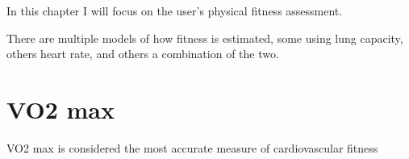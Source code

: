 In this chapter I will focus on the user's physical fitness assessment.

There are multiple models of how fitness is estimated, some using lung capacity, others heart rate, and others a combination of the two.

\section{VO2 max}
VO2 max is considered the most accurate measure of cardiovascular fitness 